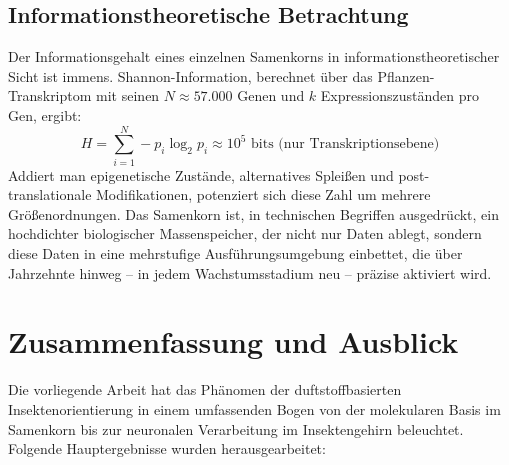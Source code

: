 ﻿\documentclass[12pt,a4paper]{article}
\begin{document}
\subsection{Informationstheoretische Betrachtung}

Der Informationsgehalt eines einzelnen Samenkorns in informationstheoretischer Sicht ist immens. Shannon-Information, berechnet \"uber das Pflanzen-Transkriptom mit seinen $N \approx 57.000$ Genen und $k$ Expressionszust\"anden pro Gen, ergibt:
\[
  H = \sum_{i=1}^{N} - p_i \log_2 p_i \approx 10^5 \text{ bits (nur Transkriptionsebene)}
\]
Addiert man epigenetische Zust\"ande, alternatives Splei{\ss}en und post-translationale Modifikationen, potenziert sich diese Zahl um mehrere Gr\"o{\ss}enordnungen. Das Samenkorn ist, in technischen Begriffen ausgedr\"uckt, ein hochdichter biologischer Massenspeicher, der nicht nur Daten ablegt, sondern diese Daten in eine mehrstufige Ausf\"uhrungsumgebung einbettet, die \"uber Jahrzehnte hinweg -- in jedem Wachstumsstadium neu -- pr\"azise aktiviert wird.

\section{Zusammenfassung und Ausblick}

Die vorliegende Arbeit hat das Ph\"anomen der duftstoffbasierten Insektenorientierung in einem umfassenden Bogen von der molekularen Basis im Samenkorn bis zur neuronalen Verarbeitung im Insektengehirn beleuchtet. Folgende Hauptergebnisse wurden herausgearbeitet:
\end{document}
